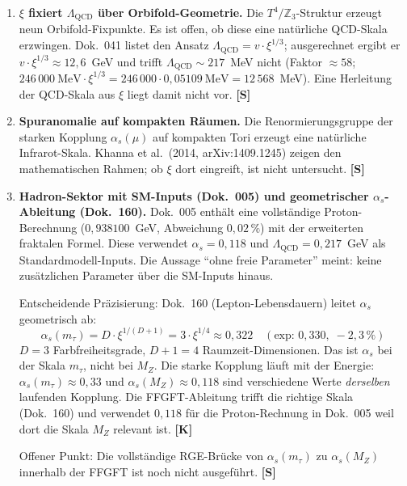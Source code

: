 \begin{enumerate}
  \item \textbf{$\xi$ fixiert $\Lambda_{\mathrm{QCD}}$ über
    Orbifold-Geometrie.} Die $T^4/\mathbb{Z}_3$-Struktur erzeugt neun
    Orbifold-Fixpunkte. Es ist offen, ob diese eine natürliche QCD-Skala
    erzwingen. Dok.~041 listet den Ansatz
    $\Lambda_{\mathrm{QCD}} = v \cdot \xi^{1/3}$; ausgerechnet ergibt er
    $v \cdot \xi^{1/3} \approx 12{,}6$~GeV und trifft
    $\Lambda_{\mathrm{QCD}} \sim 217$~MeV nicht (Faktor $\approx 58$;
    $246\,000~\mathrm{MeV} \cdot \xi^{1/3} = 246\,000 \cdot
    0{,}05109~\mathrm{MeV} = 12\,568$~MeV). Eine
    Herleitung der QCD-Skala aus $\xi$ liegt damit nicht vor. \textbf{[S]}

  \item \textbf{Spuranomalie auf kompakten Räumen.} Die Renormierungsgruppe
    der starken Kopplung $\alpha_s(\mu)$ auf kompakten Tori erzeugt
    eine natürliche Infrarot-Skala. Khanna et al.\ (2014, arXiv:1409.1245)
    zeigen den mathematischen Rahmen; ob $\xi$ dort eingreift,
    ist nicht untersucht. \textbf{[S]}

  \item \textbf{Hadron-Sektor mit SM-Inputs (Dok.~005) und
    geometrischer $\alpha_s$-Ableitung (Dok.~160).}
    Dok.~005 enthält eine vollständige Proton-Berechnung
    ($0{,}938100$~GeV, Abweichung $0{,}02\,\%$) mit der erweiterten
    fraktalen Formel. Diese verwendet $\alpha_s = 0{,}118$
    und $\Lambda_{\mathrm{QCD}} = 0{,}217$~GeV als
    Standardmodell-Inputs. Die Aussage ``ohne freie Parameter''
    meint: keine zusätzlichen Parameter über die SM-Inputs hinaus.

    Entscheidende Präzisierung:
    Dok.~160 (Lepton-Lebensdauern) leitet $\alpha_s$ geometrisch ab:
    \begin{equation}
      \alpha_s(m_\tau) = D \cdot \xi^{1/(D+1)} = 3 \cdot \xi^{1/4}
      \approx 0{,}322 \quad (\text{exp: }0{,}330,\; -2{,}3\,\%)
    \end{equation}
    $D = 3$ Farbfreiheitsgrade, $D+1 = 4$ Raumzeit-Dimensionen.
    Das ist $\alpha_s$ bei der Skala $m_\tau$, nicht bei $M_Z$.
    Die starke Kopplung läuft mit der Energie: $\alpha_s(m_\tau)
    \approx 0{,}33$ und $\alpha_s(M_Z) \approx 0{,}118$ sind
    verschiedene Werte \emph{derselben} laufenden Kopplung.
    Die FFGFT-Ableitung trifft die richtige Skala (Dok.~160)
    und verwendet $0{,}118$ für die Proton-Rechnung in Dok.~005
    weil dort die Skala $M_Z$ relevant ist. \textbf{[K]}

    Offener Punkt: Die vollständige RGE-Brücke von
    $\alpha_s(m_\tau)$ zu $\alpha_s(M_Z)$ innerhalb der FFGFT
    ist noch nicht ausgeführt. \textbf{[S]}
\end{enumerate}

